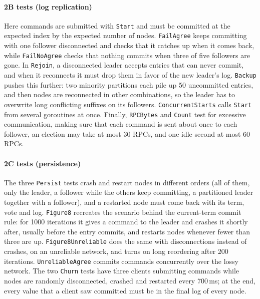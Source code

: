 \documentclass[conference]{IEEEtran}
\begin{document}
\paragraph{2B tests (log replication)} Here commands are submitted with \texttt{Start} and must be committed at the expected index by the expected number of nodes.
\texttt{FailAgree} keeps committing with one follower disconnected and checks that it catches up when it comes back,
while \texttt{FailNoAgree} checks that nothing commits when three of five followers are gone. In \texttt{Rejoin}, a disconnected leader accepts entries that can never commit,
and when it reconnects it must drop them in favor of the new leader's log. \texttt{Backup} pushes this further: two minority partitions each pile up 50 uncommitted entries,
and then nodes are reconnected in other combinations, so the leader has to overwrite long conflicting suffixes on its followers.
\texttt{ConcurrentStarts} calls \texttt{Start} from several goroutines at once. Finally, \texttt{RPCBytes} and \texttt{Count} test for excessive communication,
making sure that each command is sent about once to each follower, an election may take at most 30 RPCs, and one idle second at most 60 RPCs.

\paragraph{2C tests (persistence)} The three \texttt{Persist} tests crash and restart nodes in different orders (all of them, only the leader, a follower while the others keep committing, a partitioned leader together with a follower), and a restarted node must come back with its term, vote and log. \texttt{Figure8} recreates the scenario behind the current-term commit rule: for 1000 iterations it gives a command to the leader and crashes it shortly after, usually before the entry commits, and restarts nodes whenever fewer than three are up. \texttt{Figure8Unreliable} does the same with disconnections instead of crashes, on an unreliable network, and turns on long reordering after 200 iterations. \texttt{UnreliableAgree} commits commands concurrently over the lossy network. The two \texttt{Churn} tests have three clients submitting commands while nodes are randomly disconnected, crashed and restarted every 700\,ms; at the end, every value that a client saw committed must be in the final log of every node.
\end{document}
